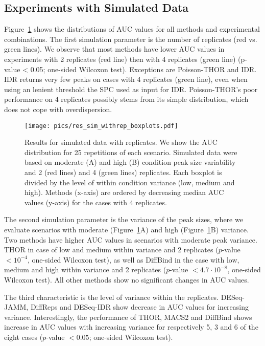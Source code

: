 \subsection{Experiments with Simulated Data}
Figure~\ref{pic_res_sim_with} shows the distributions of AUC values for all methods and experimental combinations. 
The first simulation parameter is the number of replicates (red vs. green lines). 
We observe that most methods have lower AUC values in experiments with 2 replicates (red line) then with 4 replicates (green line) (p-value < 0.05; one-sided Wilcoxon test). 
Exceptions are Poisson-THOR and IDR. 
IDR returns very few peaks on cases with 4 replicates (green line), even when using an lenient threshold the SPC used as input for IDR. 
Poisson-THOR's poor performance on 4 replicates possibly stems from its simple distribution, which does not cope with overdispersion.

\begin{figure}[h]
 \begin{center}
  \texttt{[image: pics/res\_sim\_withrep\_boxplots.pdf]}
 \end{center}
 \caption[Simulation results with replicates]{Results for simulated data with replicates. 
 We show the AUC distribution for 25 repetitions of each scenario. 
 Simulated data were based on moderate (A) and high (B) condition peak size variability and 2 (red lines) and 4 (green lines) replicates. 
 Each boxplot is divided by the level of within condition variance (low, medium and high). 
 Methods (x-axis) are ordered by decreasing median AUC values (y-axis) for the cases with 4 replicates.
}
 \label{pic_res_sim_with}
\end{figure}

The second simulation parameter is the variance of the peak sizes, where we evaluate scenarios with moderate (Figure~\ref{pic_res_sim_with}A) and high (Figure~\ref{pic_res_sim_with}B) variance. 
Two methods have higher AUC values in scenarios with moderate peak variance. 
THOR in case of low and medium within variance and 2 replicates ($p$-value $< 10^{-4}$, one-sided Wilcoxon test), as well as DiffBind in the case with low, medium and high within variance and 2 replicates ($p$-value $< 4.7 \cdot 10^{-8}$, one-sided Wilcoxon test). 
All other methods show no significant changes in AUC values. 

The third characteristic is the level of variance within the replicates. 
DESeq-JAMM, Diff\-Re\-ps and DESeq-IDR show decrease in AUC values for increasing variance. 
Interestingly, the performance of THOR, MACS2 and DiffBind shows increase in AUC values with increasing variance for respectively 5, 3 and 6 of the eight cases ($p$-value $< 0.05$; one-sided Wilcoxon test).

